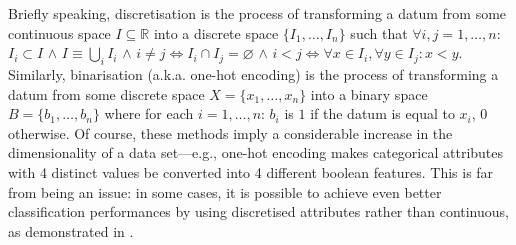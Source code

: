 \documentclass[12pt,a4paper,openright,twoside]{book}
\begin{document}
Briefly speaking, discretisation is the process of transforming a datum from some continuous space $I \subseteq \mathbb{R}$ into a discrete space $\{ I_1, \ldots, I_n \}$ such that $\forall i,j  = 1, \ldots, n$:
%
$I_i \subset I$
$\wedge$ %
$I \equiv \bigcup_i I_i$
$\wedge$ %
$i \neq j \Leftrightarrow I_i \cap I_j = \varnothing $
$\wedge$ %
$i < j \Leftrightarrow \forall x \in I_i, \forall y \in I_j : x < y $.
%
Similarly, binarisation (a.k.a. one-hot encoding) is the process of transforming a datum from some discrete space $X = \{x_1, \ldots, x_n \}$ into a binary space $B = \{ b_1, \ldots, b_{n} \}$ where for each $i  = 1, \ldots, n$: $b_i$ is $1$ if the datum is equal to $x_i$, $0$ otherwise.
%
Of course, these methods imply a considerable increase in the dimensionality of a data set---e.g., one-hot encoding makes categorical attributes with 4 distinct values be converted into 4 different boolean features.
%
This is far from being an issue: in some cases, it is possible to achieve even better classification performances by using discretised attributes rather than continuous, as demonstrated in \cite{ElhilbawiE021}.
\end{document}
